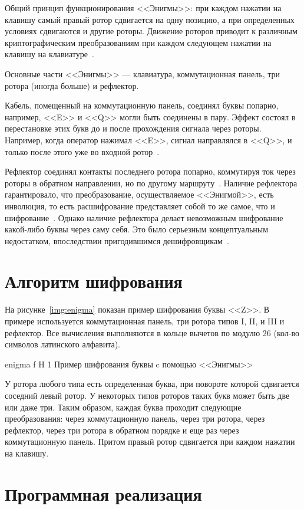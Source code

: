 \documentclass{bmstu}
\begin{document}
Общий принцип функционирования <<Энигмы>>: при каждом нажатии на клавишу самый правый ротор сдвигается на одну позицию, а при определенных условиях сдвигаются и другие роторы. 
Движение роторов приводит к различным криптографическим преобразованиям при каждом следующем нажатии на клавишу на клавиатуре~\cite{stripp}.

Основные части <<Энигмы>> --- клавиатура, коммутационная панель, три ротора (иногда больше) и рефлектор.

Кабель, помещенный на коммутационную панель, соединял буквы попарно, например, <<E>> и <<Q>> могли быть соединены в пару. 
Эффект состоял в перестановке этих букв до и после прохождения сигнала через роторы. 
Например, когда оператор нажимал <<E>>, сигнал направлялся в <<Q>>, и только после этого уже во входной ротор~\cite{wiki}.

Рефлектор соединял контакты последнего ротора попарно, коммутируя ток через роторы в обратном направлении, но по другому маршруту~\cite{singh}. 
Наличие рефлектора гарантировало, что преобразование, осуществляемое <<Энигмой>>, есть инволюция, то есть расшифрование представляет собой то же самое, что и шифрование~\cite{bauer}. 
Однако наличие рефлектора делает невозможным шифрование какой-либо буквы через саму себя. 
Это было серьезным концептуальным недостатком, впоследствии пригодившимся дешифровщикам~\cite{wiki}.

\chapter{Алгоритм шифрования}

На рисунке~\ref{img:enigma} показан пример шифрования буквы <<Z>>. 
В примере используется коммутационная панель, три ротора типов I, II, и III и рефлектор.  
Все вычисления выполняются в кольце вычетов по модулю 26 (кол-во символов латинского алфавита).

    {enigma}
    {f}
    {H}
    {1\textwidth}
    {Пример шифрования буквы c помощью <<Энигмы>>}
    
У ротора любого типа есть определенная буква, при повороте которой сдвигается соседний левый ротор. 
У некоторых типов роторов таких букв может быть две или даже три. 
Таким образом, каждая буква проходит следующие преобразования: через коммутационную панель, через три ротора, через рефлектор, через три ротора в обратном порядке и еще раз через коммутационную панель. 
Притом правый ротор сдвигается при каждом нажатии на клавишу.

\chapter{Программная реализация}
\end{document}
